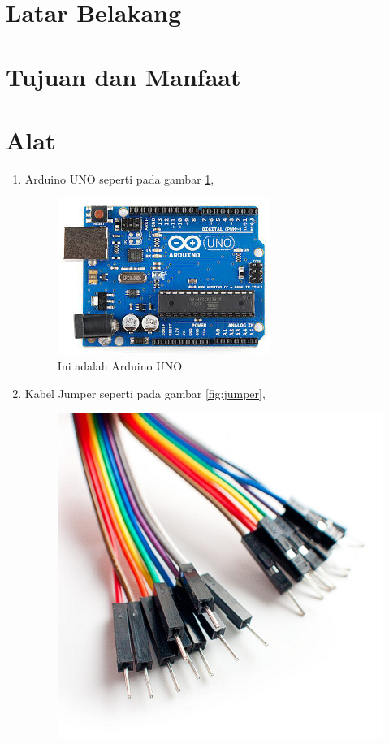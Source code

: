 \section{Latar Belakang}

\section{Tujuan dan Manfaat}

\section{Alat}
\begin{enumerate}
  \item Arduino UNO seperti pada gambar \ref{fig:arduinouno},
  \begin{figure}[!htbp]
  \centering
  \includegraphics[width=.75\textwidth]{figures/Arduino/arduinouno.jpg}
  \caption{Ini adalah Arduino UNO}\label{fig:arduinouno}
\end{figure}
  \item Kabel Jumper seperti pada gambar \ref{fig:jumper},
  \begin{figure}[!htbp]
  \centering
  \includegraphics[width=.75\textwidth]{figures/Arduino/jumper.jpg}

\end{figure}
\end{enumerate}
